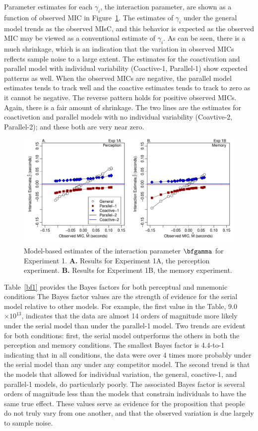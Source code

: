 \documentclass[fignum,nobf,man]{apa}
\newcommand{\scN}[1]{$\times 10^{#1}$}
\begin{document}
Parameter estimates for each $\gamma_i$, the interaction parameter, are shown as a function of observed MIC in Figure~\ref{est1}.  The estimates of $\gamma_i$ under the general model trends as the observed MIsC, and this behavior is expected as the observed MIC may be viewed as a conventional estimate of $\gamma_i$.   As can be seen, there is a much shrinkage, which is an indication that the variation in observed MICs reflects sample noise to a large extent.  The estimates for the coactivation and parallel model with individual variability (Coactive-1, Parallel-1) show expected patterns as well.  When the observed MICs are negative, the parallel model estimates tends to track well and the coactive estimates tends to track to zero as it cannot be negative.  The reverse pattern holds for positive observed MICs.  Again, there is a fair amount of shrinkage.  The two lines are the estimates for coactivetion and parallel models with no individual variability  (Coavtive-2, Parallel-2); and these both are very near zero. 

\begin{figure}
\centering
\includegraphics[width=6in]{jonFigures/jEst1.pdf}
\caption{Model-based estimates of the interaction parameter $\bfgamma$ for Experiment 1.  {\bf A.} Results for Experiment 1A, the perception experiment.  {\bf B.} Results for Experiment 1B, the memory experiment.}
\label{est1}
\end{figure}


Table~\ref{bf1} provides the Bayes factors for both perceptual and mnemonic conditions  The Bayes factor values are the strength of evidence for the serial model relative to other models.  For example, the first value in the Table, 9.0 \scN{13}, indicates that the data are almost 14 orders of magnitude more likely under the serial model than under the parallel-1 model.    Two trends are evident for both conditions: first, the serial model outperforms the others in both the perception and memory conditions.  The smallest Bayes factor is 4.4-to-1 indicating that in all conditions, the data were over 4 times more probably under the serial model than any under any competitor model.  The second trend is that the models that allowed for individual variation, the general, coactive-1, and parallel-1 models, do particularly poorly.  The associated Bayes factor is several orders of magnitude less than the models that constrain individuals to have the same true effect.  These values serve as evidence for the proposition that people do not truly vary from one another, and that the observed variation is due largely to sample noise.
\end{document}
